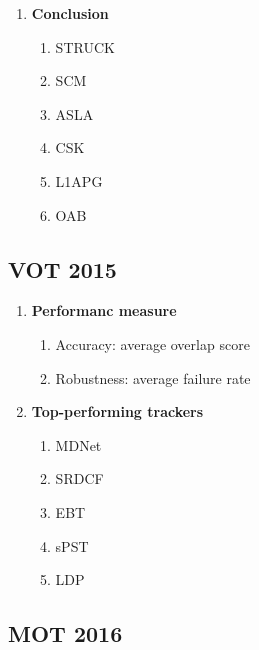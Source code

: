\begin{enumerate}
    \item
      \textbf{Conclusion}
      \begin{enumerate}
        \item
          STRUCK
          \cite{hare2016struck}
        \item
          SCM
          \cite{zhong2012robust}
        \item
          ASLA
          \cite{jia2012visual}
        \item
          CSK
          \cite{henriques2012exploiting}
        \item
          L1APG
          \cite{bao2012real}
        \item
          OAB
          \cite{grabner2006real}
      \end{enumerate}
  \end{enumerate}

  \subsection{VOT
  2015}
  \cite{kristan2015visual}

  \begin{enumerate}
    \item
      \textbf{Performanc
      measure}
      \begin{enumerate}
        \item
          Accuracy:
          average
          overlap
          score
        \item
          Robustness:
          average
          failure
          rate
      \end{enumerate}
    \item
      \textbf{Top-performing
      trackers}
      \begin{enumerate}
        \item
          MDNet
          \cite{nam2015learning}
        \item
          SRDCF
          \cite{danelljan2015learning}
        \item
          EBT
          \cite{zhu2015tracking}
        \item
          sPST
          \cite{hua2015online}
        \item
          LDP
          \cite{lukevzivc2016deformable}
      \end{enumerate}
  \end{enumerate}

  \subsection{MOT
  2016}
  \cite{milan2016mot16}

